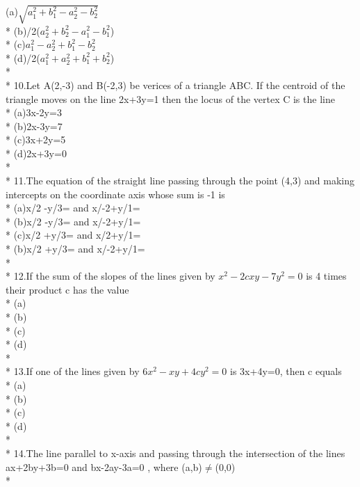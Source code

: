\documentclass{article}
\begin{document}
{(a)\enspace$\sqrt {a_1^2+b_1^2-a_2^2-b_2^2}$\\*
(b)/2($a_2^2+b_2^2-a_1^2-b_1^2$)\\*
(c)\enspace $a_1^2-a_2^2+b_1^2-b_2^2$\\*
(d)/2($a_1^2+a_2^2+b_1^2+b_2^2$)\\*\\*
10.\enspace Let A(2,-3) and B(-2,3) be verices of a triangle ABC. If the centroid of the triangle moves on the line 2x+3y=1 then the locus of the vertex C is the line\\*
(a)\enspace 3x-2y=3 \\*
(b)\enspace 2x-3y=7 \\*
(c)\enspace 3x+2y=5\\*
(d)\enspace 2x+3y=0\\*\\*
11.The equation of the straight line passing through the point (4,3) and making intercepts on the coordinate axis whose sum is -1 is\\*
(a)\enspace x/2 \enspace -\enspace y/3= and x/-2\enspace+\enspace y/1=\\*
(b)\enspace x/2 \enspace -\enspace y/3= and x/-2\enspace+\enspace y/1=\\*
(c)\enspace x/2 \enspace +\enspace y/3= and x/2\enspace+\enspace y/1=\\*
(b)\enspace x/2 \enspace +\enspace y/3= and x/-2\enspace+\enspace y/1=\\*\\*
12.\enspace If the sum of the slopes of the lines given by $x^2-2cxy-7y^2=0$ is 4 times their product c has the value\\*
(a) \\*
(b) \\*
(c)\\*
(d)\\*\\*
13.\enspace If one of the lines given by $6x^2-xy+4cy^2=0$ is 3x+4y=0, then c equals \\*
(a) \\*
(b) \\*
(c)\\*
(d)\\*\\*
14.\enspace The line parallel to x-axis and passing through the intersection of the lines ax+2by+3b=0 and bx-2ay-3a=0 , where (a,b)$\neq$(0,0)\\*
}
\end{document}
